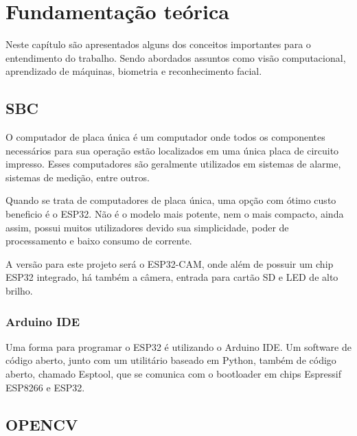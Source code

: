 \chapter{Fundamentação te\'orica}\label{cap:referencialTeorico}

Neste capítulo são apresentados alguns dos conceitos importantes para o entendimento do trabalho. Sendo abordados assuntos como visão computacional, aprendizado de máquinas, biometria e reconhecimento facial.

\section{SBC}\label{sec:formatacaoTexto}

O computador de placa única é um computador onde todos os componentes necessários para sua operação estão localizados em uma única placa de circuito impresso. Esses computadores são geralmente utilizados em sistemas de alarme, sistemas de medição, entre outros.

Quando se trata de computadores de placa única, uma opção com ótimo custo beneficio é o ESP32. Não é o modelo mais potente, nem o mais compacto, ainda assim, possui muitos utilizadores devido sua simplicidade, poder de processamento e baixo consumo de corrente.

A versão para este projeto será o ESP32-CAM, onde além de possuir um chip ESP32 integrado, há também a câmera, entrada para cartão SD e LED de alto brilho.

\subsection{Arduino IDE}\label{sec:espacamento}

Uma forma para programar o ESP32 é utilizando o Arduino IDE.
Um software de código aberto, junto com um utilitário baseado em Python, também de código
aberto, chamado Esptool, que se comunica com o bootloader em chips Espressif ESP8266 e
ESP32.

\section{OPENCV}\label{sec:formatacaoTexto}

